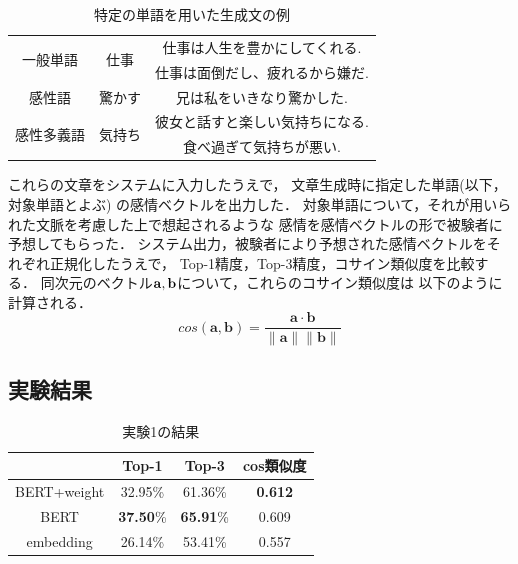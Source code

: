 		\begin{table}[H]
			\centering
			\caption{特定の単語を用いた生成文の例}
			\label{table:generated_sentences_sample}
			\begin{tabular}{|c|c|c|}
				\hline
				\multirow{2}{*}{一般単語} & \multirow{2}{*}{仕事} & 仕事は人生を豊かにしてくれる. \\
				\cline{3-3}
				& & 仕事は面倒だし、疲れるから嫌だ. \\
				\hline
				感性語 & 驚かす & 兄は私をいきなり驚かした. \\
				\hline
				\multirow{2}{*}{感性多義語} & \multirow{2}{*}{気持ち} & 彼女と話すと楽しい気持ちになる. \\
				\cline{3-3}
				& & 食べ過ぎて気持ちが悪い. \\
				\hline
			\end{tabular}
		\end{table}

		これらの文章をシステムに入力したうえで，
		文章生成時に指定した単語(以下，対象単語とよぶ)
		の感情ベクトルを出力した．
		対象単語について，それが用いられた文脈を考慮した上で想起されるような
		感情を感情ベクトルの形で被験者に予想してもらった．
		システム出力，被験者により予想された感情ベクトルをそれぞれ正規化したうえで，
		Top-1精度，Top-3精度，コサイン類似度を比較する．
		同次元のベクトル$\bold{a},\bold{b}$について，これらのコサイン類似度は
		以下のように計算される．
		\begin{equation}
			cos(\boldsymbol{a},\boldsymbol{b})=\frac{\boldsymbol{a}\cdot\boldsymbol{b}}{\|\boldsymbol{a}\|\|\boldsymbol{b}\|}
		\end{equation}

	\subsection{実験結果}
		\begin{table}[H]
			\centering
			\caption{実験1の結果}
			\label{table:top-k_cos-sim_all}
				\begin{tabular}{cccc}
					\hline
					& Top-1 & Top-3 & cos類似度 \\
					\hline \hline
					BERT+weight & 32.95\% & 61.36\% & \textbf{0.612} \\
					BERT & \textbf{37.50}\% & \textbf{65.91}\% & 0.609 \\
					embedding & 26.14\% & 53.41\% & 0.557\\
					\hline
				\end{tabular}
		\end{table}
		
